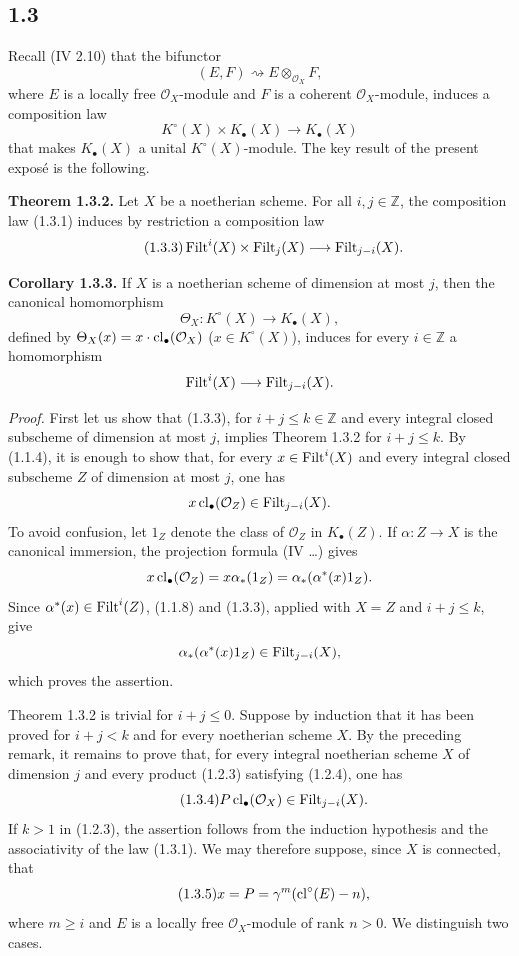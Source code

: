 \subsection*{1.3}
Recall (IV 2.10) that the bifunctor
\[
(E,F)\rightsquigarrow E\otimes_{\mathcal O_X}F,
\]
where $E$ is a locally free $\mathcal O_X$-module and $F$ is a coherent
$\mathcal O_X$-module, induces a composition law
\begin{equation}\tag{1.3.1}
K^\circ(X)\times K_\bullet(X)\longrightarrow K_\bullet(X)
\end{equation}
that makes $K_\bullet(X)$ a unital $K^\circ(X)$-module. The key result of the
present expos\'e is the following.

\textbf{Theorem 1.3.2.}
Let $X$ be a noetherian scheme. For all $i,j\in\mathbb Z$, the composition law
(1.3.1) induces by restriction a composition law
\begin{equation}\tag{1.3.3}
\operatorname{Filt}^i(X)\times\operatorname{Filt}_j(X)\longrightarrow\operatorname{Filt}_{j-i}(X).
\end{equation}

\textbf{Corollary 1.3.3.}
If $X$ is a noetherian scheme of dimension at most $j$, then the canonical
homomorphism
\[
\Theta_X:K^\circ(X)\longrightarrow K_\bullet(X),
\]
defined by $\Theta_X(x)=x\cdot\operatorname{cl}_\bullet(\mathcal O_X)$
($x\in K^\circ(X)$), induces for every $i\in\mathbb Z$ a homomorphism
\[
\operatorname{Filt}^i(X)\longrightarrow\operatorname{Filt}_{j-i}(X).
\]

\emph{Proof.}
First let us show that (1.3.3), for $i+j\leq k\in\mathbb Z$ and every integral
closed subscheme of dimension at most $j$, implies Theorem 1.3.2 for
$i+j\leq k$. By (1.1.4), it is enough to show that, for every
$x\in\operatorname{Filt}^i(X)$ and every integral closed subscheme $Z$ of dimension at most
$j$, one has
\[
x\operatorname{cl}_\bullet(\mathcal O_Z)\in\operatorname{Filt}_{j-i}(X).
\]
To avoid confusion, let $1_Z$ denote the class of $\mathcal O_Z$ in
$K_\bullet(Z)$. If $\alpha:Z\to X$ is the canonical immersion, the projection
formula (IV \ldots) gives
\[
x\operatorname{cl}_\bullet(\mathcal O_Z)
=x\alpha_*(1_Z)
=\alpha_*(\alpha^*(x)1_Z).
\]
Since $\alpha^*(x)\in\operatorname{Filt}^i(Z)$, (1.1.8) and (1.3.3), applied with $X=Z$
and $i+j\leq k$, give
\[
\alpha_*(\alpha^*(x)1_Z)\in\operatorname{Filt}_{j-i}(X),
\]
which proves the assertion.

Theorem 1.3.2 is trivial for $i+j\leq0$. Suppose by induction that it has been
proved for $i+j<k$ and for every noetherian scheme $X$. By the preceding
remark, it remains to prove that, for every integral noetherian scheme $X$ of
dimension $j$ and every product (1.2.3) satisfying (1.2.4), one has
\begin{equation}\tag{1.3.4}
P\operatorname{cl}_\bullet(\mathcal O_X)\in\operatorname{Filt}_{j-i}(X).
\end{equation}
If $k>1$ in (1.2.3), the assertion follows from the induction hypothesis and
the associativity of the law (1.3.1). We may therefore suppose, since $X$ is
connected, that
\begin{equation}\tag{1.3.5}
x=P=\gamma^m(\operatorname{cl}^\circ(E)-n),
\end{equation}
where $m\geq i$ and $E$ is a locally free $\mathcal O_X$-module of rank
$n>0$. We distinguish two cases.

